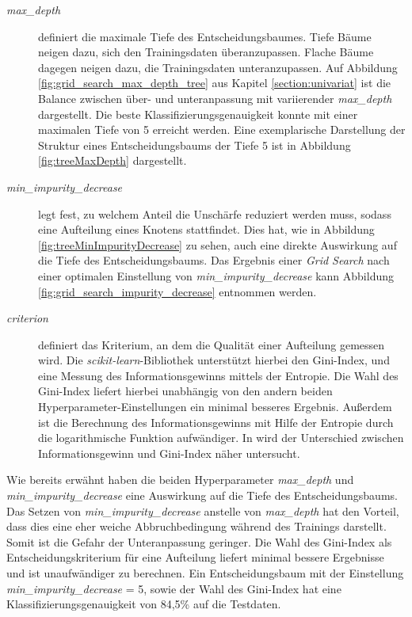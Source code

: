 \begin{description}
	\item[\emph{max\_depth}]
	 definiert die maximale Tiefe des Entscheidungsbaumes. Tiefe Bäume neigen dazu, sich den Trainingsdaten überanzupassen. Flache Bäume dagegen neigen dazu, die Trainingsdaten unteranzupassen. Auf Abbildung \ref{fig:grid_search_max_depth_tree} aus Kapitel \ref{section:univariat} ist die Balance zwischen über- und unteranpassung mit variierender \emph{max\_depth} dargestellt. Die beste Klassifizierungsgenauigkeit konnte mit einer maximalen Tiefe von 5 erreicht werden. Eine exemplarische Darstellung der Struktur eines Entscheidungsbaums der Tiefe 5 ist in Abbildung \ref{fig:treeMaxDepth} dargestellt.

	\item[\emph{min\_impurity\_decrease}] 
	legt fest, zu welchem Anteil die Unschärfe reduziert werden muss, sodass eine Aufteilung eines Knotens stattfindet. Dies hat, wie in Abbildung \ref{fig:treeMinImpurityDecrease} zu sehen, auch eine direkte Auswirkung auf die Tiefe des Entscheidungsbaums. Das Ergebnis einer \emph{Grid Search} nach einer optimalen Einstellung von \emph{min\_impurity\_decrease} kann Abbildung \ref{fig:grid_search_impurity_decrease} entnommen werden.
	
	\item[\emph{criterion}]
	definiert das Kriterium, an dem die Qualität einer Aufteilung gemessen wird. Die \emph{scikit-learn}-Bibliothek unterstützt hierbei den Gini-Index, und eine Messung des Informationsgewinns mittels der Entropie. Die Wahl des Gini-Index liefert hierbei unabhängig von den andern beiden Hyperparameter-Einstellungen ein minimal besseres Ergebnis. Außerdem ist die Berechnung des Informationsgewinns mit Hilfe der Entropie durch die logarithmische Funktion aufwändiger. In \cite{gini_entropy} wird der Unterschied zwischen Informationsgewinn und Gini-Index näher untersucht.
\end{description}

Wie bereits erwähnt haben die beiden Hyperparameter \emph{max\_depth} und \emph{min\_impurity\_decrease} eine Auswirkung auf die Tiefe des Entscheidungsbaums. Das Setzen von \emph{min\_impurity\_decrease} anstelle von  \emph{max\_depth} hat den Vorteil, dass dies eine eher weiche Abbruchbedingung während des Trainings darstellt. Somit ist die Gefahr der Unteranpassung geringer. Die Wahl des Gini-Index als Entscheidungskriterium für eine Aufteilung liefert minimal bessere Ergebnisse und ist unaufwändiger zu berechnen. Ein Entscheidungsbaum mit der Einstellung \emph{min\_impurity\_decrease} = 5, sowie der Wahl des Gini-Index hat eine Klassifizierungsgenauigkeit von 84,5\% auf die Testdaten.

